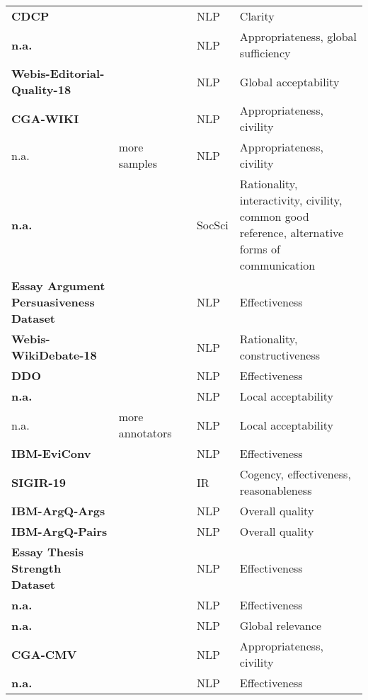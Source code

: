 {\begin{longtable}{P{4.1cm}P{1.9cm}P{3cm}P{1cm}p{4cm}}
\textbf{CDCP} && \citet{park-cardie-2018-corpus} & NLP & Clarity\\
\textbf{n.a.} && \citet{habernal-etal-2018-name} & NLP & Appropriateness, global sufficiency\\
\textbf{Webis-Editorial-Quality-18} && \citet{el-baff-etal-2018-challenge} & NLP & Global acceptability\\
\textbf{CGA-WIKI} && \citet{zhang-etal-2018-conversations} & NLP & Appropriateness, civility\\
n.a. & more samples & \citet{chang-danescu-niculescu-mizil-2019-trouble} & NLP & Appropriateness, civility\\
\textbf{n.a.} && \citet{Gerber_Baechtiger_Shikano_Reber_Rohr_2018} & SocSci & Rationality, interactivity, civility, common good reference, alternative forms of communication\\
\textbf{Essay Argument Persuasiveness Dataset} && \citet{carlile-etal-2018-give} & NLP & Effectiveness\\
\textbf{Webis-WikiDebate-18} && \citet{al-khatib-etal-2018-modeling} &  NLP & Rationality, constructiveness\\
\textbf{DDO} && \citet{durmus-cardie-2019-corpus} & NLP & Effectiveness\\
\textbf{n.a.} && \citet{yang2019corpus} & NLP & Local acceptability\\
n.a. & more annotators & \citet{yang-etal-2019-nonsense} & NLP & Local acceptability\\
\textbf{IBM-EviConv} && \citet{gleize-etal-2019-convinced} & NLP & Effectiveness\\
\textbf{SIGIR-19} && \citet{potthast2019argument} & IR & Cogency, effectiveness, reasonableness\\
\textbf{IBM-ArgQ-Args} && \citet{toledo-etal-2019-automatic} & NLP & Overall quality\\
\textbf{IBM-ArgQ-Pairs} && \citet{toledo-etal-2019-automatic} & NLP & Overall quality\\
\textbf{Essay Thesis Strength Dataset} && \citet{ke-etal-2019-give} & NLP & Effectiveness\\
\textbf{n.a.} && \citet{potash-etal-2019-ranking} & NLP & Effectiveness\\
\textbf{n.a.} && \citet{durmus-etal-2019-role} & NLP & Global relevance\\
\textbf{CGA-CMV} && \citet{chang-danescu-niculescu-mizil-2019-trouble} & NLP & Appropriateness, civility\\
\textbf{n.a.} && \citet{atkinson-etal-2019-gets} & NLP & Effectiveness\\

\end{longtable}}
